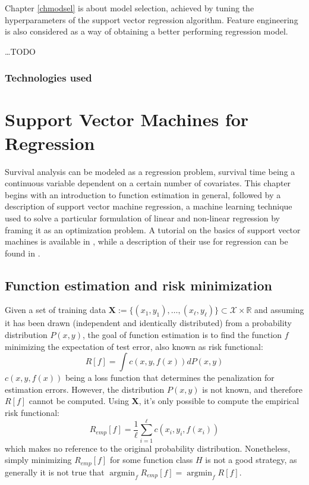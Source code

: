 \documentclass[12pt]{report}
\begin{document}
Chapter \ref{chmodsel} is about model selection, achieved by tuning the hyperparameters of the support vector regression algorithm. Feature engineering is also considered as a way of obtaining a better performing regression model.

\ldots TODO

\subsection*{Technologies used}

\chapter{Support Vector Machines for Regression}
\label{chsvm}
Survival analysis can be modeled as a regression problem, survival time being a continuous variable dependent on a certain number of covariates. This chapter begins with an introduction to function estimation in general, followed by a description of support vector machine regression, a machine learning technique used to solve a particular formulation of linear and non-linear regression by framing it as an optimization problem. A tutorial on the basics of support vector machines is available in \cite{svmtutorial}, while a description of their use for regression can be found in \cite{svregtutorial}.

\section{Function estimation and risk minimization}
Given a set of training data $ \mathbf{X} := \lbrace (x_{1},y_{1}),\ldots,(x_{\ell},y_{\ell})\rbrace \subset \mathcal{X} \times \mathbb{R} $ and assuming it has been drawn (independent and identically distributed) from a probability distribution $ P(x,y) $, the goal of function estimation is to find the function $ f $ minimizing the expectation of test error, also known as risk functional:
\begin{equation} \label{riskfun}
R[f] = \int c(x,y,f(x))dP(x,y)
\end{equation}
$ c(x,y,f(x)) $ being a loss function that determines the penalization for estimation errors. However, the distribution $ P(x,y) $ is not known, and therefore $ R[f] $ cannot be computed. Using $ \mathbf{X} $, it's only possible to compute the empirical risk functional:
\begin{equation} \label{empriskfun}
R_{emp}[f] = \dfrac{1}{\ell} \sum_{i=1}^{\ell}c(x_{i},y_{i},f(x_{i}))
\end{equation}
which makes no reference to the original probability distribution. Nonetheless, simply minimizing $ R_{emp}[f] $ for some function class $ H $ is not a good strategy, as generally it is not true that $ \operatorname*{argmin}_{f} R_{emp}[f] = \operatorname*{argmin}_{f} R[f] $.
\end{document}
